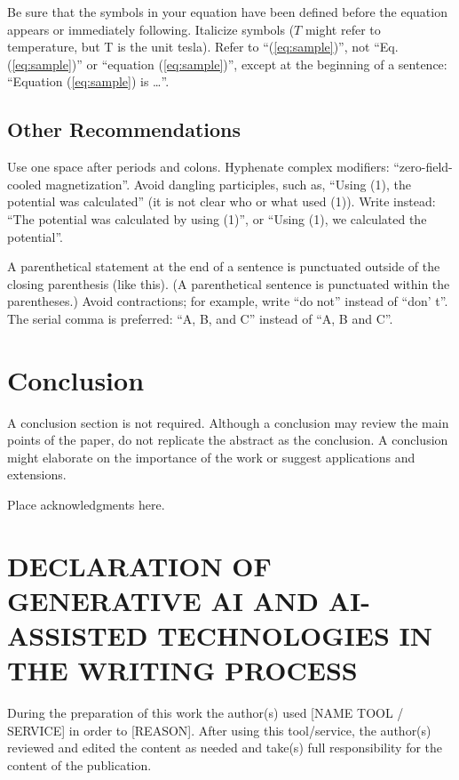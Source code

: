 \documentclass{ifacconf}
\begin{document}
Be sure that the symbols in your equation have been defined before the
equation appears or immediately following. Italicize symbols ($T$
might refer to temperature, but T is the unit tesla). Refer to
``(\ref{eq:sample})'', not ``Eq. (\ref{eq:sample})'' or ``equation
(\ref{eq:sample})'', except at the beginning of a sentence: ``Equation
(\ref{eq:sample}) is \ldots''.

\subsection{Other Recommendations}

Use one space after periods and colons. Hyphenate complex modifiers:
``zero-field-cooled magnetization''. Avoid dangling participles, such
as, ``Using (1), the potential was calculated'' (it is not clear who or
what used (1)). Write instead: ``The potential was calculated by using
(1)'', or ``Using (1), we calculated the potential''.

A parenthetical statement at the end of a sentence is punctuated
outside of the closing parenthesis (like this). (A parenthetical
sentence is punctuated within the parentheses.) Avoid contractions;
for example, write ``do not'' instead of ``don' t''. The serial comma
is preferred: ``A, B, and C'' instead of ``A, B and C''.


\section{Conclusion}

A conclusion section is not required. Although a conclusion may review
the main points of the paper, do not replicate the abstract as the
conclusion. A conclusion might elaborate on the importance of the work
or suggest applications and extensions.

\begin{ack}
Place acknowledgments here.
\end{ack}

\section*{DECLARATION OF GENERATIVE AI AND AI-ASSISTED TECHNOLOGIES IN THE WRITING PROCESS}
During the preparation of this work the author(s) used [NAME TOOL / SERVICE] in order to [REASON]. After using this tool/service, the author(s) reviewed and edited the content as needed and take(s) full responsibility for the content of the publication.
\end{document}
